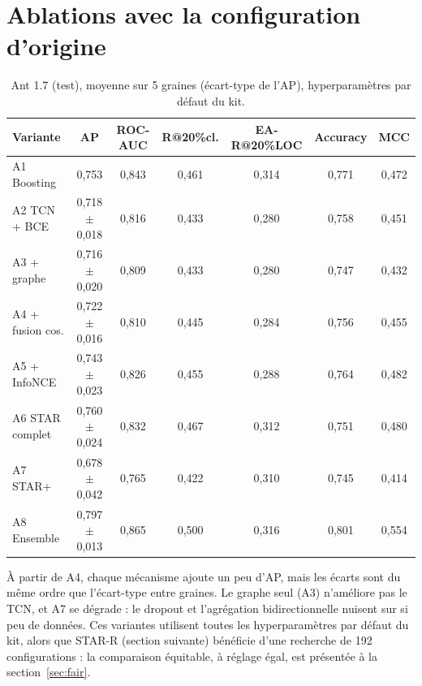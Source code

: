 \documentclass[11pt,a4paper,openany]{report}
\begin{document}
\section{Ablations avec la configuration d'origine}
\begin{table}[htbp]
\centering\small
\caption{Ant 1.7 (test), moyenne sur 5 graines (écart-type de l'AP), hyperparamètres par défaut du kit.}
\label{tab:abl}
\begin{tabular}{lcccccc}
\toprule
\textbf{Variante} & \textbf{AP} & \textbf{ROC-AUC} & \textbf{R@20\%cl.} & \textbf{EA-R@20\%LOC} & \textbf{Accuracy} & \textbf{MCC} \\
\midrule
A1 Boosting        & 0,753            & 0,843 & 0,461 & 0,314 & 0,771 & 0,472 \\
A2 TCN + BCE       & 0,718 $\pm$ 0,018 & 0,816 & 0,433 & 0,280 & 0,758 & 0,451 \\
A3 + graphe        & 0,716 $\pm$ 0,020 & 0,809 & 0,433 & 0,280 & 0,747 & 0,432 \\
A4 + fusion cos.   & 0,722 $\pm$ 0,016 & 0,810 & 0,445 & 0,284 & 0,756 & 0,455 \\
A5 + InfoNCE       & 0,743 $\pm$ 0,023 & 0,826 & 0,455 & 0,288 & 0,764 & 0,482 \\
A6 STAR complet    & 0,760 $\pm$ 0,024 & 0,832 & 0,467 & 0,312 & 0,751 & 0,480 \\
A7 STAR+           & 0,678 $\pm$ 0,042 & 0,765 & 0,422 & 0,310 & 0,745 & 0,414 \\
A8 Ensemble        & 0,797 $\pm$ 0,013 & 0,865 & 0,500 & 0,316 & 0,801 & 0,554 \\
\bottomrule
\end{tabular}
\end{table}

À partir de A4, chaque mécanisme ajoute un peu d'AP, mais les écarts sont du même ordre que l'écart-type entre
graines. Le graphe seul (A3) n'améliore pas le TCN, et A7 se dégrade : le dropout et l'agrégation bidirectionnelle
nuisent sur si peu de données. Ces variantes utilisent toutes les hyperparamètres par défaut du kit, alors que STAR-R
(section suivante) bénéficie d'une recherche de 192 configurations : la comparaison équitable, à réglage égal, est
présentée à la section~\ref{sec:fair}.
\end{document}
